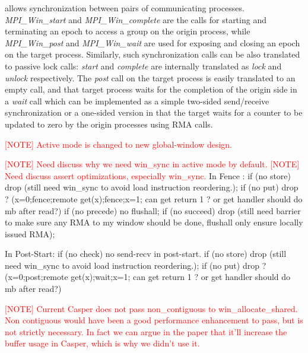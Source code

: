  allows synchronization between pairs of communicating
processes. \textit{MPI\_Win\_start} and \textit{MPI\_Win\_complete}
are the calls for starting and terminating an epoch to access a group
on the origin process, while \textit{MPI\_Win\_post} and \textit{MPI\_Win\_wait}
are used for exposing and closing an epoch on the target process.
Similarly, such synchronization calls can be also translated to
passive lock calls: \textit{start} and \textit{complete} are
internally translated as \textit{lock} and \textit{unlock}
respectively. The \textit{post} call on the target process is easily
translated to an empty call, and that target process waits for the
completion of the origin side in a \textit{wait} call which can be
implemented as a simple two-sided send\slash receive synchronization
or a one-sided version in that the target waits for a counter to be updated
to zero by the origin processes using RMA calls.


\textcolor{red}{[NOTE] Active mode is changed to new global-window design.}

\textcolor{red}{[NOTE] Need discuss why we need win\_sync in active mode by default.}
\textcolor{red}{[NOTE] Need discuss assert optimizations, especially win\_sync.}
In Fence :
if (no store) drop (still need win\_sync to avoid load instruction
reordering.);
if (no put) drop ? (x=0;fence;remote get(x);fence;x=1; can get return 1 ? or get handler should do mb after read?)
if (no precede) no flushall;
if (no succeed) drop (still need barrier to make sure any RMA to my
window should be done, flushall only ensure locally issued RMA);

In Post-Start:
if (no check) no send-recv in post-start.
if (no store) drop (still need win\_sync to avoid load instruction
reordering.);
if (no put) drop ? (x=0;post;remote get(x);wait;x=1; can get return 1 ? or get handler should do mb after read?)

\textcolor{red}{
[NOTE] Current Casper does not pass non\_contiguous to win\_allocate\_shared.
Non contiguous would have been a good performance enhancement to pass, but is not strictly necessary.  In fact we can argue in the paper that it'll increase the buffer usage in Casper, which is why we didn't use it.}